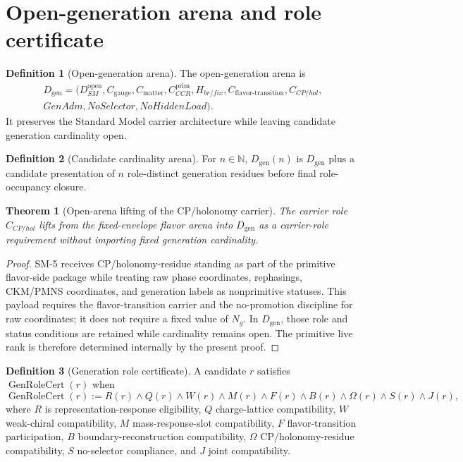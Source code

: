 \documentclass[11pt]{article}
\newcommand{\Dgen}{D_{\mathrm{gen}}}
\newcommand{\DSMopen}{D_{SM}^{\mathrm{open}}}
\newcommand{\Cgauge}{C_{\mathrm{gauge}}}
\newcommand{\Cmatter}{C_{\mathrm{matter}}}
\newcommand{\CCCR}{C_{CCR}^{\mathrm{prim}}}
\newcommand{\CH}{H_{br/fix}}
\newcommand{\Cflavtrans}{C_{\mathrm{flavor\text{-}transition}}
}
\newcommand{\CCPHol}{C_{CP/hol}}
\newcommand{\GenRoleCert}{\operatorname{GenRoleCert}}
\theoremstyle{definition}
\newtheorem{definition}{Definition}[section]
\theoremstyle{plain}
\newtheorem{theorem}{Theorem}[section]
\theoremstyle{remark}
\begin{document}
\section{Open-generation arena and role certificate}

\begin{definition}[Open-generation arena]
The open-generation arena is
\[
\begin{aligned}
\Dgen=(\DSMopen,\Cgauge,\Cmatter,\CCCR,\CH,\Cflavtrans,\CCPHol,\\
GenAdm,NoSelector,NoHiddenLoad).
\end{aligned}
\]
It preserves the Standard Model carrier architecture while leaving candidate generation cardinality open.
\end{definition}

\begin{definition}[Candidate cardinality arena]
For \(n\in\mathbb N\), \(\Dgen(n)\) is \(\Dgen\) plus a candidate presentation of \(n\) role-distinct generation residues before final role-occupancy closure.
\end{definition}

\begin{theorem}[Open-arena lifting of the CP/holonomy carrier]
The carrier role \(\CCPHol\) lifts from the fixed-envelope flavor arena into \(\Dgen\) as a carrier-role requirement without importing fixed generation cardinality.
\end{theorem}
\begin{proof}
SM-5 receives CP/holonomy-residue standing as part of the primitive flavor-side package while treating raw phase coordinates, rephasings, CKM/PMNS coordinates, and generation labels as nonprimitive statuses. This payload requires the flavor-transition carrier and the no-promotion discipline for raw coordinates; it does not require a fixed value of \(N_g\). In \(\Dgen\), those role and status conditions are retained while cardinality remains open. The primitive live rank is therefore determined internally by the present proof.
\end{proof}

\begin{definition}[Generation role certificate]
A candidate \(r\) satisfies \(\GenRoleCert(r)\) when
\[
\GenRoleCert(r):=R(r)\wedge Q(r)\wedge W(r)\wedge M(r)\wedge F(r)\wedge B(r)\wedge \Omega(r)\wedge S(r)\wedge J(r),
\]
where \(R\) is representation-response eligibility, \(Q\) charge-lattice compatibility, \(W\) weak-chiral compatibility, \(M\) mass-response-slot compatibility, \(F\) flavor-transition participation, \(B\) boundary-reconstruction compatibility, \(\Omega\) CP/holonomy-residue compatibility, \(S\) no-selector compliance, and \(J\) joint compatibility.
\end{definition}
\end{document}
